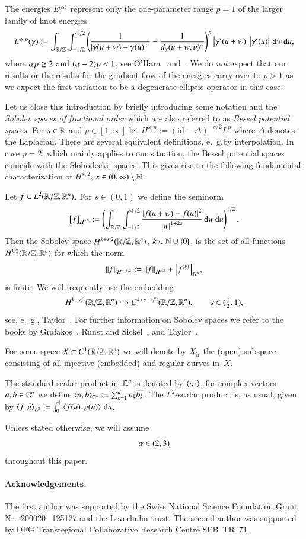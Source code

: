 The energies $\E$ represent only the one-parameter range $p=1$ of the larger family of knot energies
\begin{equation*}
  E^{\a,p}(\g) :=
  \int_{\R/\Z}\int_{-1/2}^{1/2}
  \br{\frac{1}{\abs{\g(u+w)-\g(u)}^\a} - \frac{1}{d_\g(u+w,u)^\a}}^p
  \abs{\dg(u+w)}\abs{\dg(u)} \d w\d u, \label{eq:a-p}
\end{equation*}
where $\a p\ge2$ and $(\a-2)p<1$, see O'Hara~\cite{oha:fam-en,oha:en-func} and~\cite{blatt:bre,blatt-reiter}.
We do \emph{not} expect that our results or the results for the gradient flow of the energies
carry over to $p>1$ as we expect the 
first variation to be a degenerate elliptic operator in this case.

Let us close this introduction by briefly introducing some notation and the
\emph{Sobolev spaces of fractional order} which are also referred to as \emph{Bessel potential spaces}.
For $s\in\R$ and $p\in[1,\infty]$ let
$H^{s,p} := (\mathrm{id}-\Delta)^{-s/2} L^p$ where $\Delta$ denotes the Laplacian.
There are several equivalent definitions, e.~g.\@ by
interpolation. In case $p=2$, which mainly applies to our situation,
the Bessel potential spaces coincide with the Slobodeckij spaces.
This gives rise to the following fundamental characterization of $H^{s,2}$, $s\in(0,\infty)\setminus\N$.

Let $f\in L^2\rzd$. For $s\in(0,1)$ we define the seminorm
\[ \seminorm{f}_{H^{s,2}} := \br{\int_{\R/\Z}\int_{-1/2}^{1/2} \frac{\abs{f(u+w)-f(u)}^2}{\abs w^{1+2s}} \d w\d u}^{1/2}. \]
Then the Sobolev space $H^{k+s,2}\rzd$, $k\in\N\cup\set0$,
is the set of all functions $H^{k,2}\rzd$ for which the norm
\[ \norm f_{H^{s+k,2}} := \norm f_{H^{k,2}} + \seminorm{f^{(k)}}_{H^{s,2}} \]
is finite.
We will frequently use the embedding
\begin{equation}\label{eq:embedding}
 H^{k+s,2}\rzd\hookrightarrow C^{k+s-1/2}\rzd, \qquad s\in(\tfrac12,1),
\end{equation}
see, e.~g., Taylor~\cite[Chap.~4, Prop.~1.5]{taylor}.
For further information on Sobolev spaces we refer to the books by Grafakos~\cite[Chap.~6]{grafakos:modern},
Runst and Sickel~\cite[Chap.~2]{RS},
and Taylor~\cite[Chap.~4 and~13]{taylor}.

For some space $X\subset C^{1}\rzd$ we will denote by $X_\mathrm{ir}$ the (open) subspace consisting of all
\underline injective (embedded) and \underline regular curves in~$X$.

The standard scalar product in~$\R^n$ is denoted by $\sp{\cdot,\cdot}$, for complex vectors $a,b\in\C^n$ we define
$\sp{a,b}_{\C^n}:=\sum_{k=1}^da_k\overline{b_k}$. The $L^2$-scalar product is, as usual, given by
$\sp{f,g}_{L^2}:=\int_0^1\sp{f(u),g(u)}\d u$.

Unless stated otherwise, we will assume
\[ \a\in(2,3) \]
throughout this paper.

\paragraph{Acknowledgements.}
The first author was supported by the Swiss National Science Foundation Grant Nr.~200020\_125127 and
the Leverhulm trust.
The second author was supported by DFG Transregional Collaborative Research Centre SFB~TR~71.
